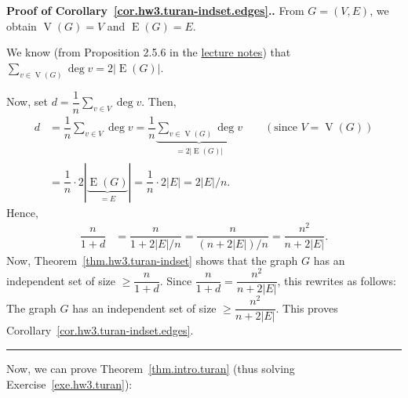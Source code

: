 \documentclass[numbers=enddot,12pt,final,onecolumn,notitlepage]{scrartcl}%
\theoremstyle{definition}
\newenvironment{proof}[1][Proof]{\noindent\textbf{#1.} }{\ \rule{0.5em}{0.5em}}
\let\sumnonlimits\sum
\renewcommand{\sum}{\sumnonlimits\limits}
\newcommand{\abs}[1]{\left| #1 \right|}
\newcommand{\tup}[1]{\left( #1 \right)}
\newcommand{\verts}[1]{\operatorname{V}\left( #1 \right)}
\newcommand{\edges}[1]{\operatorname{E}\left( #1 \right)}
\newcommand{\underbrack}[2]{\underbrace{#1}_{\substack{#2}}}
\begin{document}
\begin{proof}[Proof of Corollary~\ref{cor.hw3.turan-indset.edges}.]
From $G = \tup{V, E}$, we obtain $\verts{G} = V$ and $\edges{G} = E$.

We know (from
Proposition 2.5.6 in the
\href{http://www-users.math.umn.edu/~dgrinber/5707s17/nogra.pdf}{lecture notes})
that $\sum_{v \in \verts{G}} \deg v = 2 \abs{\edges{G}}$.

Now, set $d = \dfrac{1}{n} \sum_{v \in V} \deg v$.
Then,
\begin{align*}
d
&= \dfrac{1}{n} \sum_{v \in V} \deg v
= \dfrac{1}{n} \underbrack{\sum_{v \in \verts{G}} \deg v}
                          {= 2 \abs{\edges{G}}}
\qquad \left(\text{since } V = \verts{G}\right) \\
&= \dfrac{1}{n} \cdot 2 \abs{\underbrace{\edges{G}}_{= E}}
= \dfrac{1}{n} \cdot 2 \abs{E} = 2 \abs{E} / n .
\end{align*}
Hence,
\begin{align*}
\dfrac{n}{1+d}
&= \dfrac{n}{1 + 2 \abs{E} / n}
= \dfrac{n}{\tup{n + 2 \abs{E}} / n}
= \dfrac{n^2}{n+2\abs{E}}.
\end{align*}
Now, Theorem~\ref{thm.hw3.turan-indset} shows that the graph
$G$ has an independent set of size $\geq \dfrac{n}{1+d}$.
Since $\dfrac{n}{1+d} = \dfrac{n^2}{n+2\abs{E}}$, this rewrites as
follows:
The graph $G$ has an independent set of size
$\geq \dfrac{n^2}{n+2\abs{E}}$.
This proves Corollary~\ref{cor.hw3.turan-indset.edges}.
\end{proof}

Now, we can prove Theorem~\ref{thm.intro.turan} (thus solving
Exercise~\ref{exe.hw3.turan}):
\end{document}
